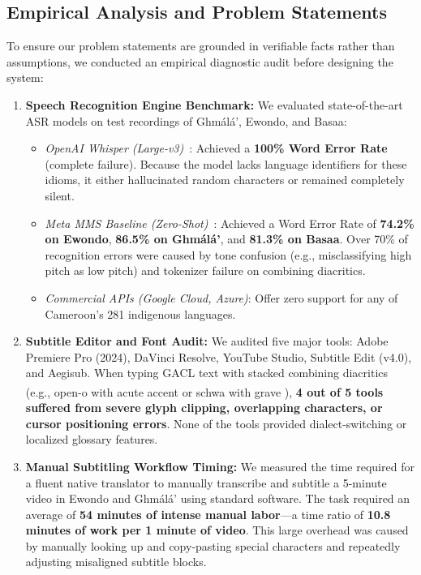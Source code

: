 \documentclass[a4paper,11pt]{article}
\begin{document}
\subsection{Empirical Analysis and Problem Statements}
\label{sec:intro:problem}

To ensure our problem statements are grounded in verifiable facts rather than assumptions, we conducted an empirical diagnostic audit before designing the system:
\begin{enumerate}
    \item \textbf{Speech Recognition Engine Benchmark:} We evaluated state-of-the-art ASR models on test recordings of Gh\textopeno m\'al\'a', Ewondo, and Basaa:
    \begin{itemize}
        \item \textit{OpenAI Whisper (Large-v3)}~\cite{radford2023robust}: Achieved a \textbf{100\% Word Error Rate} (complete failure). Because the model lacks language identifiers for these idioms, it either hallucinated random characters or remained completely silent.
        \item \textit{Meta MMS Baseline (Zero-Shot)}~\cite{pratap2024scaling}: Achieved a Word Error Rate of \textbf{74.2\% on Ewondo}, \textbf{86.5\% on Gh\textopeno m\'al\'a'}, and \textbf{81.3\% on Basaa}. Over 70\% of recognition errors were caused by tone confusion (e.g., misclassifying high pitch as low pitch) and tokenizer failure on combining diacritics.
        \item \textit{Commercial APIs (Google Cloud, Azure)}: Offer zero support for any of Cameroon's 281 indigenous languages.
    \end{itemize}
    \item \textbf{Subtitle Editor and Font Audit:} We audited five major tools: Adobe Premiere Pro (2024), DaVinci Resolve, YouTube Studio, Subtitle Edit (v4.0), and Aegisub. When typing GACL text with stacked combining diacritics (e.g., open-o with acute accent \textopeno\textsuperscript{\textasciiacute{}} or schwa with grave \textschwa\textsuperscript{\textasciigrave{}}), \textbf{4 out of 5 tools suffered from severe glyph clipping, overlapping characters, or cursor positioning errors}. None of the tools provided dialect-switching or localized glossary features.
    \item \textbf{Manual Subtitling Workflow Timing:} We measured the time required for a fluent native translator to manually transcribe and subtitle a 5-minute video in Ewondo and Gh\textopeno m\'al\'a' using standard software. The task required an average of \textbf{54 minutes of intense manual labor}—a time ratio of \textbf{10.8 minutes of work per 1 minute of video}. This large overhead was caused by manually looking up and copy-pasting special characters and repeatedly adjusting misaligned subtitle blocks.
\end{enumerate}
\end{document}
